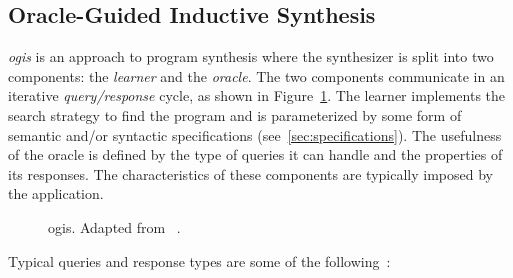 \subsection{Oracle-Guided Inductive Synthesis}
\label{sec:ogis}

\textit{\Gls{ogis}} is an approach to program synthesis where the synthesizer is
split into two components: the \textit{learner} and the \textit{oracle}. The two
components communicate in an iterative \textit{query/response} cycle, as shown
in Figure~\ref{fig:ogis}. The learner implements the search strategy to find the
program and is parameterized by some form of semantic and/or syntactic
specifications (see~\ref{sec:specifications}). The usefulness of the oracle is
defined by the type of queries it can handle and the properties of its
responses. The characteristics of these components are typically imposed by the
application.

\begin{figure}[htb]
  \centering
  \caption{\Acrlong{ogis}. Adapted from
    \protect\citeauthor{Jha:2017:TFS}~\protect\cite{Jha:2017:TFS}.}
  \label{fig:ogis}
\end{figure}

Typical queries and response types are some of the following~\cite{Jha:2017:TFS}:

